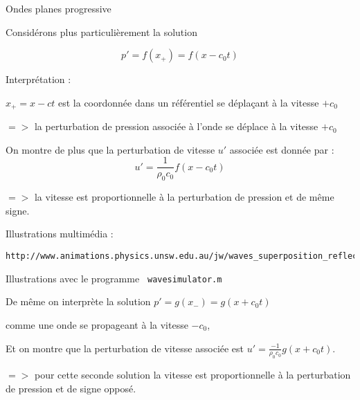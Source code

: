 \begin{frame}[fragile]{Ondes planes progressive }
\small

Considérons plus particulièrement la solution 

$$ p' =  f(x_+) = f(x-c_0 t)  $$

\medskip
Interprétation : 

$x_+ = x-ct$ est la coordonnée dans un référentiel se déplaçant à la vitesse $+c_0$

\smallskip
$=>$ la perturbation de pression associée à l'onde se déplace à la vitesse $+c_0$

\smallskip

On montre de plus que la perturbation de vitesse $u'$ associée est donnée par :
$$
u' = \frac{1}{\rho_0 c_0} f(x-c_0 t)
$$

$=>$ la  vitesse est proportionnelle à la perturbation de pression {\color{vert} et de même signe}.

\smallskip

{\color{bleu}  Illustrations multimédia :
{\scriptsize
\begin{verbatim}
http://www.animations.physics.unsw.edu.au/jw/waves_superposition_reflection.htm#travelling
\end{verbatim}
}

 Illustrations avec le programme \verb| wavesimulator.m |
}

\pause
\bigskip

De même on interprète la solution $ p' =  g(x_-) = g(x+c_0 t)  $ 

comme une onde se propageant à la vitesse $-c_0$, 

Et on montre que la perturbation de vitesse associée est $u' = \frac{-1}{\rho_0 c_0} g(x+c_0 t)$.

$=>$ pour cette seconde solution la vitesse est proportionnelle à la perturbation de pression et 
{\color{vert} de signe opposé}.







\vspace{0mm}

\end{frame}



